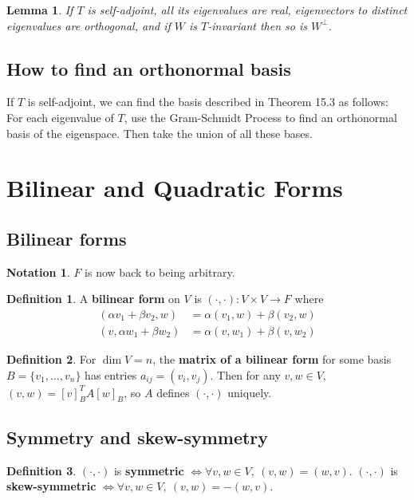 \documentclass[12pt]{article}
\newtheorem{lem}[thm]{Lemma}
\theoremstyle{definition}
\newtheorem*{defn*}{Definition}
\newtheorem*{not*}{Notation}
\begin{document}
\begin{lem}
	If $T$ is self-adjoint, all its eigenvalues are real, eigenvectors to distinct eigenvalues are orthogonal, and if $W$ is $T$-invariant then so is $W^{\bot}$.
\end{lem}

\subsection{How to find an orthonormal basis}

If $T$ is self-adjoint, we can find the basis described in Theorem 15.3 as follows:
For each eigenvalue of $T$, use the Gram-Schmidt Process to find an orthonormal basis of the eigenspace.
Then take the union of all these bases.

\section{Bilinear and Quadratic Forms}

\subsection{Bilinear forms}

\begin{not*}
	$F$ is now back to being arbitrary.
\end{not*}

\begin{defn*}
	A \textbf{bilinear form} on $V$ is $(\cdot, \cdot) : V \times V \to F$ where
	\begin{align*}
		(\alpha v_1 + \beta v_2, w) &= \alpha(v_1, w) + \beta(v_2, w)\\
		(v, \alpha w_1 + \beta w_2) &= \alpha(v, w_1) + \beta(v, w_2)
	\end{align*}
\end{defn*}

\begin{defn*}
	For $\dim{V} = n$, the \textbf{matrix of a bilinear form} for some basis $B = \{v_1, \ldots, v_n\}$ has entries $a_{ij} = (v_i, v_j)$.
	Then for any $v, w \in V$, $(v, w) = [v]_B^TA[w]_B$, so $A$ defines $(\cdot, \cdot)$ uniquely.
\end{defn*}

\subsection{Symmetry and skew-symmetry}

\begin{defn*}
	$(\cdot, \cdot)$ is \textbf{symmetric} $\iff \forall v, w \in V,\ (v, w) = (w, v)$.
	$(\cdot, \cdot)$ is \textbf{skew-symmetric} $\iff \forall v, w \in V,\ (v, w) = -(w, v)$.
\end{defn*}
\end{document}

